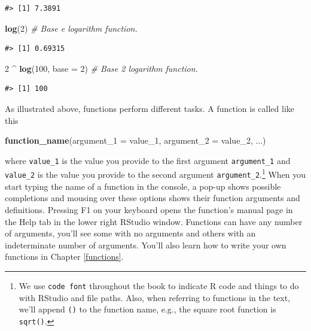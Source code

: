 \documentclass[
  11pt,
]{krantz}
\newenvironment{Shaded}{\begin{snugshade}}{\end{snugshade}}
\newcommand{\CommentTok}[1]{\textcolor[rgb]{0.56,0.35,0.01}{\textit{#1}}}
\newcommand{\DataTypeTok}[1]{\textcolor[rgb]{0.13,0.29,0.53}{#1}}
\newcommand{\DecValTok}[1]{\textcolor[rgb]{0.00,0.00,0.81}{#1}}
\newcommand{\KeywordTok}[1]{\textcolor[rgb]{0.13,0.29,0.53}{\textbf{#1}}}
\newcommand{\NormalTok}[1]{#1}
\newcommand{\OperatorTok}[1]{\textcolor[rgb]{0.81,0.36,0.00}{\textbf{#1}}}
\newcommand{\StringTok}[1]{\textcolor[rgb]{0.31,0.60,0.02}{#1}}
\theoremstyle{definition}
\theoremstyle{definition}
\theoremstyle{definition}
\theoremstyle{definition}
\theoremstyle{remark}
\begin{document}
\begin{verbatim}
#> [1] 7.3891
\end{verbatim}

\begin{Shaded}
\begin{Highlighting}[]
\KeywordTok{log}\NormalTok{(}\DecValTok{2}\NormalTok{)  }\CommentTok{\# Base e logarithm function.}
\end{Highlighting}
\end{Shaded}

\begin{verbatim}
#> [1] 0.69315
\end{verbatim}

\begin{Shaded}
\begin{Highlighting}[]
\DecValTok{2} \OperatorTok{\^{}}\StringTok{ }\KeywordTok{log}\NormalTok{(}\DecValTok{100}\NormalTok{, }\DataTypeTok{base =} \DecValTok{2}\NormalTok{) }\CommentTok{\# Base 2 logarithm function.}
\end{Highlighting}
\end{Shaded}

\begin{verbatim}
#> [1] 100
\end{verbatim}

As illustrated above, functions perform different tasks. A function is called like this

\begin{Shaded}
\begin{Highlighting}[]
\KeywordTok{function\_name}\NormalTok{(}\DataTypeTok{argument\_1 =}\NormalTok{ value\_}\DecValTok{1}\NormalTok{, }\DataTypeTok{argument\_2 =}\NormalTok{ value\_}\DecValTok{2}\NormalTok{, ...)}
\end{Highlighting}
\end{Shaded}

where \texttt{value\_1} is the value you provide to the first argument \texttt{argument\_1} and \texttt{value\_2} is the value you provide to the second argument \texttt{argument\_2}.\footnote{We use \texttt{code\ font} throughout the book to indicate R code and things to do with RStudio and file paths. Also, when referring to functions in the text, we'll append \texttt{()} to the function name, e.g., the square root function is \texttt{sqrt()}.} When you start typing the name of a function in the console, a pop-up shows possible completions and mousing over these options shows their function arguments and definitions. Pressing F1 on your keyboard opens the function's manual page in the Help tab in the lower right RStudio window. Functions can have any number of arguments, you'll see some with no arguments and others with an indeterminate number of arguments. You'll also learn how to write your own functions in Chapter \ref{functions}.
\end{document}
